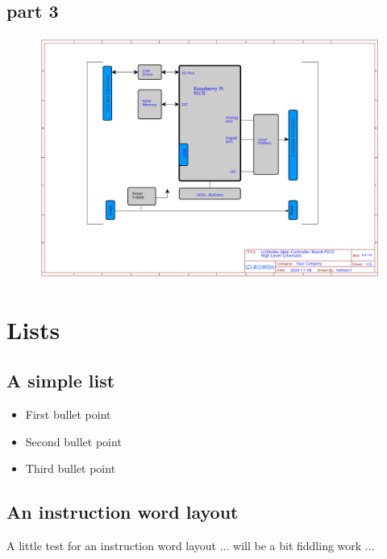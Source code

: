 \FloatBarrier

\subsection{part 3}
\begin{figure}[ht]
    \centering
    \includegraphics[page=3, width=\textwidth]{./schematics/Schematic_LcsNodes-Main-Controller-Board.pdf}
\end{figure}

\FloatBarrier


\section{Lists}

\subsection{A simple list}

\begin{itemize}
    \item First bullet point
    \item Second bullet point
    \item Third bullet point
\end{itemize}



\subsection{An instruction word layout}

A little test for an instruction word layout ... will be a bit fiddling work ... 

